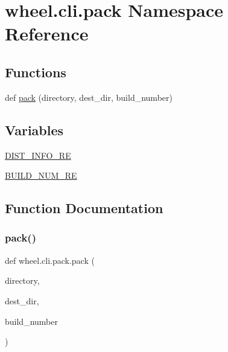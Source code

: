 \hypertarget{namespacewheel_1_1cli_1_1pack}{}\section{wheel.\+cli.\+pack Namespace Reference}
\label{namespacewheel_1_1cli_1_1pack}
\subsection*{Functions}
\begin{DoxyCompactItemize}
\item 
def \hyperlink{namespacewheel_1_1cli_1_1pack_a8f241539b5bf7e1e664fc39cf64925dd}{pack} (directory, dest\+\_\+dir, build\+\_\+number)
\end{DoxyCompactItemize}
\subsection*{Variables}
\begin{DoxyCompactItemize}
\item 
\hyperlink{namespacewheel_1_1cli_1_1pack_aa760789f1d139f14861a51ed11af0eb6}{D\+I\+S\+T\+\_\+\+I\+N\+F\+O\+\_\+\+RE}
\item 
\hyperlink{namespacewheel_1_1cli_1_1pack_a8574461e0b938e0799943d876ef111d6}{B\+U\+I\+L\+D\+\_\+\+N\+U\+M\+\_\+\+RE}
\end{DoxyCompactItemize}


\subsection{Function Documentation}
\mbox{\label{namespacewheel_1_1cli_1_1pack_a8f241539b5bf7e1e664fc39cf64925dd}} 
\subsubsection{\texorpdfstring{pack()}{pack()}}
{\footnotesize\ttfamily def wheel.\+cli.\+pack.\+pack (\begin{DoxyParamCaption}\item[{}]{directory,  }\item[{}]{dest\+\_\+dir,  }\item[{}]{build\+\_\+number }\end{DoxyParamCaption})}

